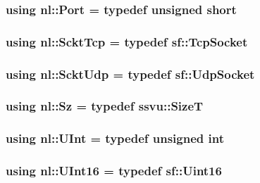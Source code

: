 \subsubsection[{Port}]{\setlength{\rightskip}{0pt plus 5cm}using {\bf nl\+::\+Port} = typedef unsigned short}\label{namespacenl_a12899c87e239db66809da0a71fcc9129}
\hypertarget{namespacenl_a2e729c5cf9a70e3b551ebc62148fd1db}{}
\subsubsection[{Sckt\+Tcp}]{\setlength{\rightskip}{0pt plus 5cm}using {\bf nl\+::\+Sckt\+Tcp} = typedef sf\+::\+Tcp\+Socket}\label{namespacenl_a2e729c5cf9a70e3b551ebc62148fd1db}
\hypertarget{namespacenl_a7f107e98f2c5ed8fe4d7e2c62af3d162}{}
\subsubsection[{Sckt\+Udp}]{\setlength{\rightskip}{0pt plus 5cm}using {\bf nl\+::\+Sckt\+Udp} = typedef sf\+::\+Udp\+Socket}\label{namespacenl_a7f107e98f2c5ed8fe4d7e2c62af3d162}
\hypertarget{namespacenl_a023c3fe765917605f0c95794cf6ebd30}{}
\subsubsection[{Sz}]{\setlength{\rightskip}{0pt plus 5cm}using {\bf nl\+::\+Sz} = typedef ssvu\+::\+Size\+T}\label{namespacenl_a023c3fe765917605f0c95794cf6ebd30}
\hypertarget{namespacenl_ae6539dc8a47674966876b1d317fb7764}{}
\subsubsection[{U\+Int}]{\setlength{\rightskip}{0pt plus 5cm}using {\bf nl\+::\+U\+Int} = typedef unsigned int}\label{namespacenl_ae6539dc8a47674966876b1d317fb7764}
\hypertarget{namespacenl_a36ef85a20c5ddd4ac50c4ea617a7caf9}{}
\subsubsection[{U\+Int16}]{\setlength{\rightskip}{0pt plus 5cm}using {\bf nl\+::\+U\+Int16} = typedef sf\+::\+Uint16}\label{namespacenl_a36ef85a20c5ddd4ac50c4ea617a7caf9}
\hypertarget{namespacenl_a5a2105bdb0a0734402590ce0805d7e31}{}
